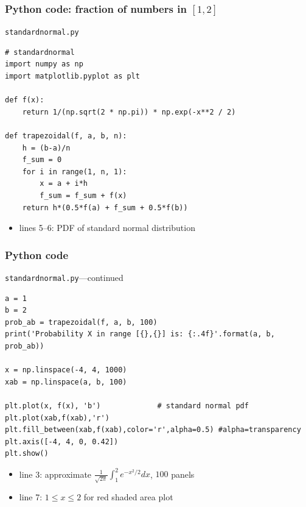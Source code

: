 \documentclass[english,14pt]{beamer}
\begin{document}

\begin{frame}[fragile]

\frametitle{Python code: fraction of numbers in $[1,2]$}

\texttt{standardnormal.py}
\begin{lstlisting}[style=CStyle,basicstyle=\scriptsize]
# standardnormal
import numpy as np
import matplotlib.pyplot as plt

def f(x):
    return 1/(np.sqrt(2 * np.pi)) * np.exp(-x**2 / 2)

def trapezoidal(f, a, b, n):
    h = (b-a)/n
    f_sum = 0
    for i in range(1, n, 1):
        x = a + i*h
        f_sum = f_sum + f(x)
    return h*(0.5*f(a) + f_sum + 0.5*f(b))
\end{lstlisting}

\begin{itemize}
	\item lines 5--6: PDF of standard normal distribution
\end{itemize}

\end{frame}


\begin{frame}[fragile]

\frametitle{Python code}

\texttt{standardnormal.py}---continued
\begin{lstlisting}[style=CStyle,basicstyle=\scriptsize]
a = 1
b = 2
prob_ab = trapezoidal(f, a, b, 100)
print('Probability X in range [{},{}] is: {:.4f}'.format(a, b, prob_ab))

x = np.linspace(-4, 4, 1000)
xab = np.linspace(a, b, 100)

plt.plot(x, f(x), 'b')             # standard normal pdf
plt.plot(xab,f(xab),'r')
plt.fill_between(xab,f(xab),color='r',alpha=0.5) #alpha=transparency
plt.axis([-4, 4, 0, 0.42])
plt.show()
\end{lstlisting}

\begin{itemize}
	\item line 3: approximate $\frac{1}{\sqrt{2\pi}} \int_1^2 e^{-x^2/2} dx$, $100$ panels
	\item line 7: $1 \leq x \leq 2$ for red shaded area plot
\end{itemize}

\end{frame}
\end{document}
